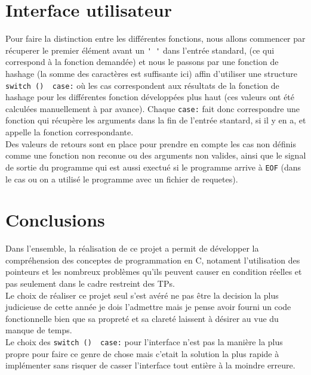 \documentclass[a4paper, 12pt]{article}
\begin{document}
	\section{Interface utilisateur}
	Pour faire la distinction entre les différentes fonctions, nous allons commencer par récuperer le premier élément avant un \lstinline|' '| dans l'entrée standard, (ce qui correspond à la fonction demandée) et nous le passons par une fonction de hashage (la somme des caractères est suffisante ici) affin d'utiliser une structure \lstinline|switch ()  case:| où les cas correspondent aux résultats de la fonction de hashage pour les différentes fonction développées plus haut (ces valeurs ont été calculées manuellement à par avance). Chaque \lstinline|case:| fait donc correspondre une fonction qui récupère les arguments dans la fin de l'entrée stantard, si il y en a, et appelle la fonction correspondante.\\
	Des valeurs de retours sont en place pour prendre en compte les cas non définis comme une fonction non reconue ou des arguments non valides, ainsi que le signal de sortie du programme qui est aussi exectué si le programme arrive à \lstinline|EOF| (dans le cas ou on a utilisé le programme avec un fichier de requetes).\\
	\newpage
	\section{Conclusions}
	Dans l'ensemble, la réalisation de ce projet a permit de développer la compréhension des conceptes de programmation en C, notament l'utilisation des pointeurs et les nombreux problèmes qu'ils peuvent causer en condition réelles et pas seulement dans le cadre restreint des TPs.\\
	Le choix de réaliser ce projet seul s'est avéré ne pas être la decision la plus judicieuse de cette année je dois l'admettre mais je pense avoir fourni un code fonctionnelle bien que sa propreté et sa clareté laissent à désirer au vue du manque de temps.\\
	Le choix des \lstinline|switch ()  case:| pour l'interface n'est pas la manière la plus propre pour faire ce genre de chose mais c'etait la solution la plus rapide à implémenter sans risquer de casser l'interface tout entière à la moindre erreure.\\  
	
	
	
	
	
\end{document}
